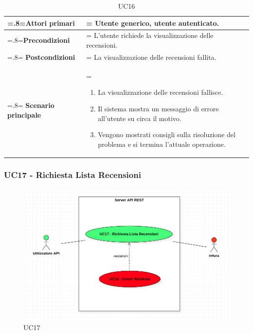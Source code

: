             \begin{table}[H]
                \centering
                \renewcommand{\arraystretch}{1.8}
                \renewcommand\tabularxcolumn[1]{m{#1}}
                \begin{tabularx}{0.9\textwidth} {
                    >{\hsize=.8\hsize\linewidth=\hsize}X
                    >{\hsize=1.2\hsize\linewidth=\hsize}X}
                    \hline
                    \textbf{Attori primari} & Utente generico, utente autenticato. \\
                    \hline
                    \textbf{Precondizioni} & L'utente richiede la visualizzazione delle recensioni. \\
                    \hline
                    \textbf{Postcondizioni} & La visualizzazione delle recensioni fallita. \\
                    \hline
                    \textbf{Scenario principale} & 
                    \begin{enumerate}
                        \item La visualizzazione delle recensioni fallisce.
                        \item Il sistema mostra un messaggio di errore all'utente su circa il motivo.
                        \item Vengono mostrati consigli sulla risoluzione del problema e si termina l'attuale operazione.
                    \end{enumerate} \\
                    \hline
                \end{tabularx}
                \caption{UC16}
            \end{table}

        \subsubsection{UC17 - Richiesta Lista Recensioni}
        \label{UC17}

            \begin{figure}[H]
                \centering
                \includegraphics[scale=0.5]{src/img/UC17.png}
                \caption{UC17}
            \end{figure}

